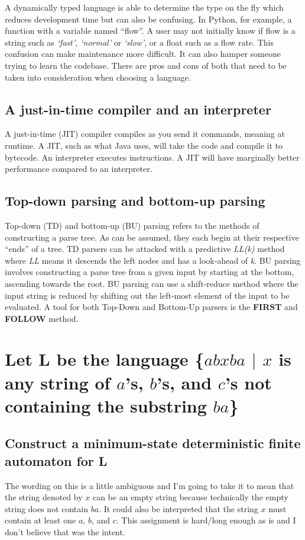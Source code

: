 \documentclass{article}
\begin{document}
A dynamically typed language is able to determine the type on the fly which 
reduces development time but can also be confusing. In Python, for example, a 
function with a variable named ``flow''. A user may not initially know if flow 
is a string such as \textit{`fast', `normal'} or \textit{`slow'}, or a float 
such as a flow rate. This confusion can make maintenance more difficult. It can 
also hamper someone trying to learn the codebase. There are pros and cons of 
both that need to be taken into consideration when choosing a language.

\subsection[JIT Compiler and Interpreters]{A just-in-time compiler and an 
interpreter}
A just-in-time (JIT) compiler compiles as you send it commands, meaning at 
runtime. A JIT, such as what Java uses, will take the code and compile it to 
bytecode. An interpreter executes instructions. A JIT will have marginally 
better performance compared to an interpreter.

\subsection[Top-Down and Bottom-Up Parsing]{Top-down parsing and bottom-up 
parsing}
Top-down (TD) and bottom-up (BU) parsing refers to the methods of constructing 
a parse tree. As can be assumed, they each begin at their respective ``ends'' 
of a tree. TD parsers can be attacked with a predictive \textit{LL(k)} method 
where \textit{LL} means it descends the left nodes and has a look-ahead of 
\textit{k}. BU parsing involves constructing a parse tree from a given input by 
starting at the bottom, ascending towards the root. BU parsing can use a 
shift-reduce method where the input string is reduced by shifting out the 
left-most element of the input to be evaluated. A tool for both Top-Down and 
Bottom-Up parsers is the \textbf{FIRST} and \textbf{FOLLOW} method.




\newpage
\section[Problem 2]{Let L be the language \{$abxba$ $\vert$ $x$ is any string 
of $a$'s, $b$'s, and $c$'s not containing the substring $ba$\}}
\subsection[Minimum-State DFA]{Construct a minimum-state deterministic finite 
automaton for L}
The wording on this is a little ambiguous and I'm going to take it to mean that 
the string denoted by $x$ can be an empty string because technically the empty 
string does not contain $ba$. It could also be interpreted that the string $x$ 
must contain at least one $a$, $b$, and $c$. This assignment is hard/long enough 
as is and I don't believe that was the intent.
\end{document}
